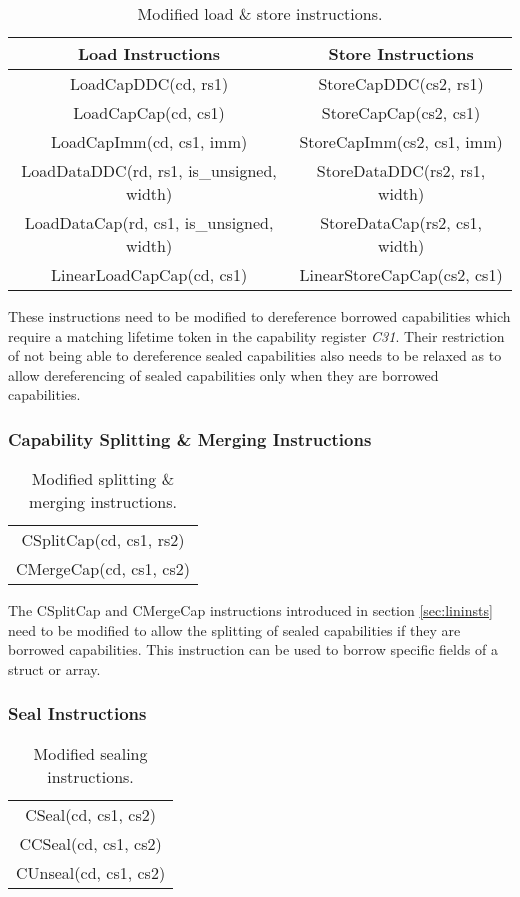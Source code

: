 \begin{table}[h]
\centering
\begin{tabular}{| c | c |}
\hline
Load Instructions & Store Instructions \\
\hline
 LoadCapDDC(cd, rs1) & StoreCapDDC(cs2, rs1) \\
 LoadCapCap(cd, cs1) & StoreCapCap(cs2, cs1) \\
 LoadCapImm(cd, cs1, imm) & StoreCapImm(cs2, cs1, imm) \\
 LoadDataDDC(rd, rs1, is\_unsigned, width) & StoreDataDDC(rs2, rs1, width) \\
 LoadDataCap(rd, cs1, is\_unsigned, width) & StoreDataCap(rs2, cs1, width) \\
 LinearLoadCapCap(cd, cs1) & LinearStoreCapCap(cs2, cs1) \\
\hline
\end{tabular}
\caption{Modified load \& store instructions.}
\label{table:borrowedderef}
\end{table}

These instructions need to be modified to dereference borrowed capabilities which require a matching lifetime token in the capability register \textit{C31}. Their restriction of not being able to dereference sealed capabilities also needs to be relaxed as to allow dereferencing of sealed capabilities only when they are borrowed capabilities.

\subsubsection{Capability Splitting \& Merging Instructions}
\begin{table}[h]
\centering
\begin{tabular}{| c |}
\hline
 CSplitCap(cd, cs1, rs2) \\
 CMergeCap(cd, cs1, cs2) \\
\hline
\end{tabular}
\caption{Modified splitting \& merging instructions.}
\label{table:borrowmodsplit}
\end{table}
The CSplitCap and CMergeCap instructions introduced in section \ref{sec:lininsts} need to be modified to allow the splitting of sealed capabilities if they are borrowed capabilities. This instruction can be used to borrow specific fields of a struct or array.

\subsubsection{Seal Instructions}
\begin{table}[h]
\centering
\begin{tabular}{| c |}
\hline
 CSeal(cd, cs1, cs2) \\
 CCSeal(cd, cs1, cs2) \\
 CUnseal(cd, cs1, cs2) \\
\hline
\end{tabular}
\caption{Modified sealing instructions.}
\label{table:borrowmodseal}
\end{table}

